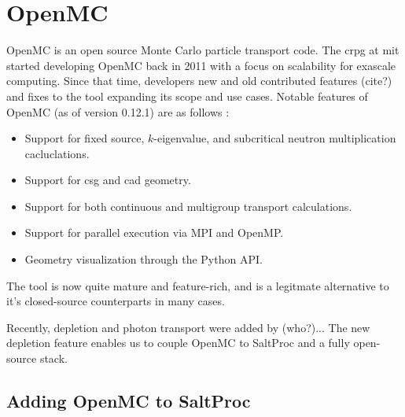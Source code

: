 \section{OpenMC}%
\label{sub:openmc}

OpenMC \cite{romano_openmc_2015} is an open source Monte Carlo particle transport code. The \Gls{crpg} at \Gls{mit} started developing OpenMC back in 2011 with a focus on scalability for exascale computing. Since that time, developers new and old contributed features (cite?) and fixes to the tool expanding its scope and use cases. Notable features of OpenMC (as of version 0.12.1) are as follows \cite{homepage_openmc_2022}:
\begin{itemize}
    \item Support for fixed source, $k$-eigenvalue, and subcritical neutron multiplication cacluclations.
    \item Support for \Gls{csg} and \Gls{cad} geometry.
    \item Support for both continuous and multigroup transport calculations.
    \item Support for parallel execution via MPI and OpenMP.
    \item Geometry visualization through the Python API.
\end{itemize}
The tool is now quite mature and feature-rich, and is a legitmate alternative to it's closed-source counterparts in many cases.

Recently, depletion and photon transport were added by (who?)... The new depletion feature enables us to couple OpenMC to SaltProc and a fully open-source stack.

\subsection{Adding OpenMC to SaltProc}%
\label{sub:adding_openmc_to_saltproc}
